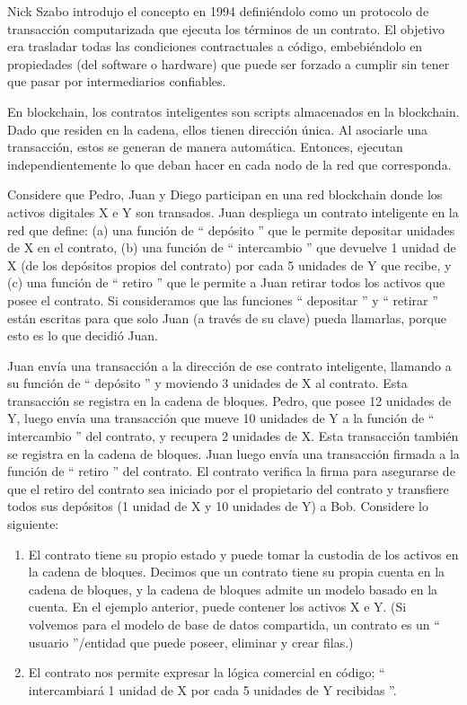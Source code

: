 Nick Szabo introdujo el concepto en 1994 definiéndolo como un protocolo de transacción computarizada que ejecuta los términos de un contrato. El objetivo era trasladar todas las condiciones contractuales a código, embebiéndolo en propiedades (del software o hardware) que puede ser forzado a cumplir sin tener que pasar por intermediarios confiables. 

En blockchain, los contratos inteligentes son scripts almacenados en la blockchain. Dado que residen en la cadena, ellos tienen dirección única. Al asociarle una transacción, estos se generan de manera automática. Entonces, ejecutan independientemente lo que deban hacer en cada nodo de la red que corresponda. 

\begin{tcolorbox}[colback=gray!5!white,colframe=orange!60!gray,title=PREGUNTA 1]
Considere que Pedro, Juan y Diego participan en una red blockchain donde los activos digitales X e Y son transados. Juan despliega un contrato inteligente en la red que define: (a) una función de `` depósito '' que le permite depositar unidades de X en el contrato, (b) una función de `` intercambio '' que devuelve 1 unidad de X (de los depósitos propios del contrato) por cada 5 unidades de Y que recibe, y (c) una función de `` retiro '' que le permite a Juan retirar todos los activos que posee el contrato.
%
Si consideramos que las funciones `` depositar '' y `` retirar '' están escritas para que solo Juan (a través de su clave) pueda llamarlas, porque esto es lo que decidió Juan.


Juan envía una transacción a la dirección de ese contrato inteligente, llamando a su función de `` depósito '' y moviendo 3 unidades de X al contrato. Esta transacción se registra en la cadena de bloques.
Pedro, que posee 12 unidades de Y, luego envía una transacción que mueve 10 unidades de Y a la función de `` intercambio '' del contrato, y recupera 2 unidades de X. Esta transacción también se registra en la cadena de bloques. Juan luego envía una transacción firmada a la función de `` retiro '' del contrato. El contrato verifica la firma para asegurarse de que el retiro del contrato sea iniciado por el propietario del contrato y transfiere todos sus depósitos (1 unidad de X y 10 unidades de Y) a Bob. Considere lo siguiente:
\begin{enumerate}
    \item El contrato tiene su propio estado y puede tomar la custodia de los activos en la cadena de bloques. Decimos que un contrato tiene su propia cuenta en la cadena de bloques, y la cadena de bloques admite un modelo basado en la cuenta. En el ejemplo anterior, puede contener los activos X e Y. (Si volvemos para el modelo de base de datos compartida, un contrato es un `` usuario ''/entidad  que puede poseer, eliminar y crear filas.) 
    \item El contrato nos permite expresar la lógica comercial en código; `` intercambiará 1 unidad de X por cada 5 unidades de Y recibidas ''.
\end{enumerate}


\end{tcolorbox}


